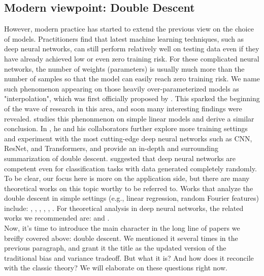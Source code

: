 \documentclass{article}
\begin{document}
\vspace{-2mm}
\subsection{Modern viewpoint: Double Descent} \label{modern}
\vspace{-1mm}
However, modern practice has started to extend the previous view on the choice of models. Practitioners find that latest machine learning techniques, such as deep neural networks, can still perform relatively well on testing data even if they have already achieved low or even zero training risk. For these complicated neural networks, the number of weights (parameters) is usually much more than the number of samples so that the model can easily reach zero training risk. We name such phenomenon appearing on those heavily over-parameterized models as "interpolation", which was first officially proposed by \cite{belkin2019reconciling}. This sparked the beginning of the wave of research in this area, and soon many interesting findings were revealed. \cite{nakkiran2019more} studies this phenonmenon on simple linear models and derive a similar conclusion. In \cite{nakkiran2021deep}, he and his collaborators further explore more training settings and experiment with the most cutting-edge deep neural networks such as CNN, ResNet, and Transformers, and provide an in-depth and surrounding summarization of double descent. \cite{zhang2021understanding} suggested that deep neural networks are competent even for classification tasks with data generated completely randomly. To be clear, our focus here is more on the application side, but there are many theoretical works on this topic worthy to be referred to. Works that analyze the double descent in simple settings (e.g., linear regression, random Fourier features) include: \cite{Bartlett_Long_Lugosi_Tsigler_2019}, \cite{Muthukumar_Vodrahalli_Subramanian_Sahai_2019}, \cite{Mitra_2019}, \cite{Derezinski_Liang_Mahoney_2019}, \cite{Liang_Rakhlin_2020}, \cite{Mei_Montanari_2022}. For theoretical analysis in deep neural networks, the related works we recommended are: \cite{d2020double} and \cite{baldassi2021unveiling}.\\

\vspace{-3mm}
Now, it's time to introduce the main character in the long line of papers we breifly covered above: double descent. We mentioned it several times in the previous paragraph, and grant it the title as the updated version of the traditional bias and variance tradeoff. But what it is? And how does it reconcile with the classic theory? We will elaborate on these questions right now.\\
\end{document}
